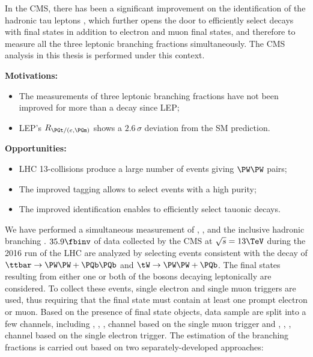 In the CMS, there has been a significant improvement on the identification of the hadronic tau leptons \cite{Chatrchyan:2012zz, Khachatryan:2015dfa, Sirunyan:2018pgf}, which further opens the door to efficiently select \PW decays with \PGth final states in addition to electron and muon final states, and therefore to measure all the three leptonic branching fractions simultaneously. The CMS analysis in this thesis is performed under this context.

    \noindent \textbf{Motivations:}
        \begin{itemize}
            \item The measurements of three \PW leptonic branching fractions have not been improved for more than a decay since LEP;
            \item LEP's $R_{\PGt/(e,\PGm)}$ shows a $2.6\,\sigma$ deviation from the SM prediction.
        \end{itemize}
    
    \noindent \textbf{Opportunities:}
        \begin{itemize}
            \item LHC 13\TeV \Pp-\Pp collisions produce a large number of \ttbar events giving $\PW\PW$ pairs;
            \item The improved \PQb tagging allows to select \ttbar events with a high purity;
            \item The improved \PGth identification enables to efficiently select \PW tauonic decays.
        \end{itemize}
\noindent We have performed a simultaneous measurement of \BWe, \BWm, \BWt and the inclusive hadronic branching \BWh. $35.9\fbinv$ of data collected by the CMS at $\sqrt{s} =13\TeV$ during the 2016 run of the LHC are analyzed by selecting events consistent with the decay of $\ttbar\to \PW\PW+\PQb\PQb$ and $\tW\to \PW\PW+\PQb$. The final states resulting from either one or both of the \PW bosons decaying leptonically are considered.  To collect these events, single electron and single muon triggers are used, thus requiring that the final state must contain at least one prompt electron or muon. Based on the presence of final state objects, data sample are split into a few channels, including \cme, \cmm, \cmt, \cmh channel based on the single muon trigger and \cee, \cem, \cet, \ceh channel based on the single electron trigger. The estimation of the \PW branching fractions is carried out based on two separately-developed approaches: 

